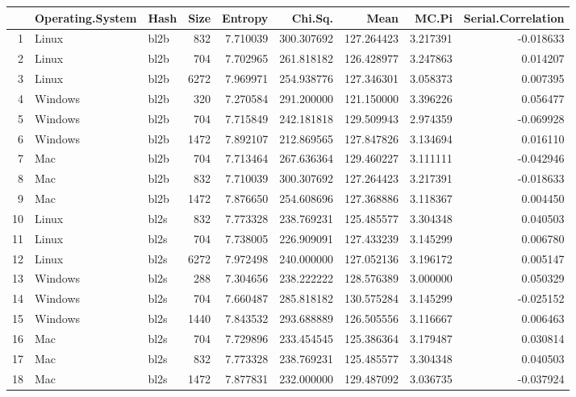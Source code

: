 \documentclass{IEEEtran}
\begin{document}
\begin{longtable}{rllrrrrrr}
  \hline
 & Operating.System & Hash & Size & Entropy & Chi.Sq. & Mean & MC.Pi & Serial.Correlation \\ 
  \hline
1 & Linux & bl2b &     832 & 7.710039 & 300.307692 & 127.264423 & 3.217391 & -0.018633 \\ 
  2 & Linux & bl2b &     704 & 7.702965 & 261.818182 & 126.428977 & 3.247863 & 0.014207 \\ 
  3 & Linux & bl2b &    6272 & 7.969971 & 254.938776 & 127.346301 & 3.058373 & 0.007395 \\ 
  4 & Windows & bl2b &     320 & 7.270584 & 291.200000 & 121.150000 & 3.396226 & 0.056477 \\ 
  5 & Windows & bl2b &     704 & 7.715849 & 242.181818 & 129.509943 & 2.974359 & -0.069928 \\ 
  6 & Windows & bl2b &    1472 & 7.892107 & 212.869565 & 127.847826 & 3.134694 & 0.016110 \\ 
  7 & Mac & bl2b &     704 & 7.713464 & 267.636364 & 129.460227 & 3.111111 & -0.042946 \\ 
  8 & Mac & bl2b &     832 & 7.710039 & 300.307692 & 127.264423 & 3.217391 & -0.018633 \\ 
  9 & Mac & bl2b &    1472 & 7.876650 & 254.608696 & 127.368886 & 3.118367 & 0.004450 \\ 
  10 & Linux & bl2s &     832 & 7.773328 & 238.769231 & 125.485577 & 3.304348 & 0.040503 \\ 
  11 & Linux & bl2s &     704 & 7.738005 & 226.909091 & 127.433239 & 3.145299 & 0.006780 \\ 
  12 & Linux & bl2s &    6272 & 7.972498 & 240.000000 & 127.052136 & 3.196172 & 0.005147 \\ 
  13 & Windows & bl2s &     288 & 7.304656 & 238.222222 & 128.576389 & 3.000000 & 0.050329 \\ 
  14 & Windows & bl2s &     704 & 7.660487 & 285.818182 & 130.575284 & 3.145299 & -0.025152 \\ 
  15 & Windows & bl2s &    1440 & 7.843532 & 293.688889 & 126.505556 & 3.116667 & 0.006463 \\ 
  16 & Mac & bl2s &     704 & 7.729896 & 233.454545 & 125.386364 & 3.179487 & 0.030814 \\ 
  17 & Mac & bl2s &     832 & 7.773328 & 238.769231 & 125.485577 & 3.304348 & 0.040503 \\ 
  18 & Mac & bl2s &    1472 & 7.877831 & 232.000000 & 129.487092 & 3.036735 & -0.037924 \\ 

\end{longtable}
\end{document}
